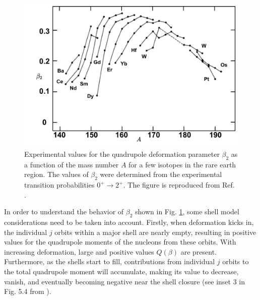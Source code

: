 \begin{figure}
    \centering
    \includegraphics[scale=0.55]{Chapters/Figures/quadrupole_Deformation_rareEarth.pdf}
    \caption{Experimental values for the quadrupole deformation parameter $\beta_2$ as a function of the mass number $A$ for a few isotopes in the rare earth region. The values of $\beta_2$ were determined from the experimental transition probabilities $0^+\to 2^+$. The figure is reproduced from Ref. \cite{casten2000nuclear}.}
    \label{fig-quadrupole-beta-nuclides}
\end{figure}

In order to understand the behavior of $\beta_2$ shown in Fig. \ref{fig-quadrupole-beta-nuclides}, some shell model considerations need to be taken into account. Firstly, when deformation kicks in, the individual $j$ orbits within a major shell are nearly empty, resulting in positive values for the quadrupole moments of the nucleons from these orbits. With increasing deformation, large and positive values $Q(\beta)$ are present. Furthermore, as the shells start to fill, contributions from individual $j$ orbits to the total quadrupole moment will accumulate, making its value to decrease, vanish, and eventually becoming negative near the shell closure (see inset 3 in Fig. 5.4 from \cite{casten2000nuclear}).

